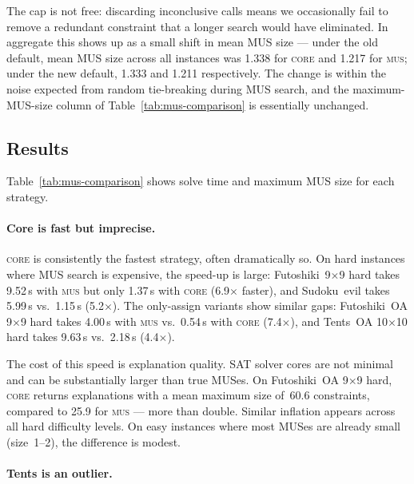 The cap is not free: discarding inconclusive calls means we
occasionally fail to remove a redundant constraint that a longer
search would have eliminated.  In aggregate this shows up as a small
shift in mean MUS size --- under the old default, mean MUS size
across all instances was 1.338 for \textsc{core} and 1.217 for
\textsc{mus}; under the new default, 1.333 and 1.211 respectively.
The change is within the noise expected from random tie-breaking
during MUS search, and the maximum-MUS-size column of
Table~\ref{tab:mus-comparison} is essentially unchanged.



\subsection{Results}

Table~\ref{tab:mus-comparison} shows solve time and maximum MUS size
for each strategy.

\paragraph{Core is fast but imprecise.}

\textsc{core} is consistently the fastest strategy, often dramatically
so.  On hard instances where MUS search is expensive, the speed-up is
large: Futoshiki~9$\times$9 hard takes 9.52\,s with \textsc{mus} but
only 1.37\,s with \textsc{core} (6.9$\times$ faster), and
Sudoku~evil takes 5.99\,s vs.\ 1.15\,s (5.2$\times$).  The
only-assign variants show similar gaps: Futoshiki~OA 9$\times$9 hard
takes 4.00\,s with \textsc{mus} vs.\ 0.54\,s with \textsc{core}
(7.4$\times$), and Tents~OA 10$\times$10 hard takes 9.63\,s vs.\
2.18\,s (4.4$\times$).

The cost of this speed is explanation quality.  SAT solver cores are
not minimal and can be substantially larger than true MUSes.  On
Futoshiki~OA 9$\times$9 hard, \textsc{core} returns explanations with
a mean maximum size of~60.6 constraints, compared to 25.9 for
\textsc{mus} --- more than double.  Similar inflation appears across
all hard difficulty levels.  On easy instances where most MUSes are
already small (size~1--2), the difference is modest.

\paragraph{Tents is an outlier.}

